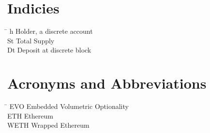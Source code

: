 \section*{Indicies}
\begin{tabbing}
 \hspace*{1.6cm}  \= \kill
 h \> Holder, a discrete account \\[0.5ex]
  St \> Total Supply \\[0.5ex]
  Dt \> Deposit at discrete block
\end{tabbing}

\section*{Acronyms and Abbreviations}
\begin{tabbing}
 \hspace*{1.6cm}  \= \kill
 EVO \> Embedded Volumetric Optionality \\[0.5ex]
 ETH \> Ethereum \\[0.5ex]
 WETH \> Wrapped Ethereum
\end{tabbing}

 \cleardoublepage

